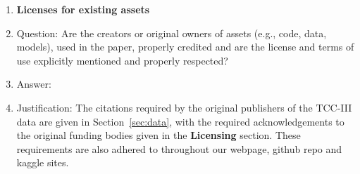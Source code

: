 \documentclass{article}
\begin{document}
\begin{enumerate}
\item {\bf Licenses for existing assets}
    \item[] Question: Are the creators or original owners of assets (e.g., code, data, models), used in the paper, properly credited and are the license and terms of use explicitly mentioned and properly respected?
    \item[] Answer: \answerYes{} %
    \item[] Justification: The citations required by the original publishers of the TCC-III data are given in Section~\ref{sec:data}, with the required acknowledgements to the original funding bodies given in the \textbf{Licensing} section. These requirements are also adhered to throughout our webpage, github repo and kaggle sites. 


\end{enumerate}
\end{document}
